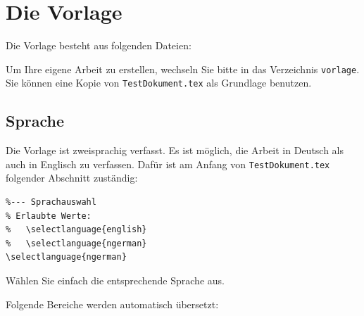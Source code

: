 \documentclass[pdftex,abstracton,a4paper]{scrartcl}
\begin{document}
\clearpage
\section{Die Vorlage}

Die Vorlage besteht aus folgenden Dateien:


Um Ihre eigene Arbeit zu erstellen, wechseln Sie bitte in das Verzeichnis
\texttt{vorlage}.
Sie können eine Kopie von \texttt{TestDokument.tex} als Grundlage benutzen.

\subsection{Sprache}
\label{sec:sprache}

Die Vorlage ist zweisprachig verfasst. 
Es ist möglich, die Arbeit in Deutsch als auch in Englisch zu verfassen.
Dafür ist am Anfang von \texttt{TestDokument.tex} folgender Abschnitt zuständig:

\begin{verbatim}
%--- Sprachauswahl
% Erlaubte Werte:
%   \selectlanguage{english}
%   \selectlanguage{ngerman}
\selectlanguage{ngerman}
\end{verbatim}

Wählen Sie einfach die entsprechende Sprache aus.

Folgende Bereiche werden automatisch übersetzt:
\end{document}
